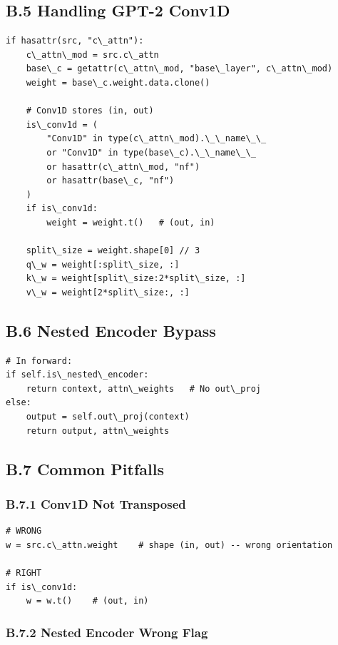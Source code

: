 \subsection{B.5 Handling GPT-2 Conv1D}

\begin{lstlisting}
if hasattr(src, "c\_attn"):
    c\_attn\_mod = src.c\_attn
    base\_c = getattr(c\_attn\_mod, "base\_layer", c\_attn\_mod)
    weight = base\_c.weight.data.clone()
    
    # Conv1D stores (in, out)
    is\_conv1d = (
        "Conv1D" in type(c\_attn\_mod).\_\_name\_\_
        or "Conv1D" in type(base\_c).\_\_name\_\_
        or hasattr(c\_attn\_mod, "nf")
        or hasattr(base\_c, "nf")
    )
    if is\_conv1d:
        weight = weight.t()   # (out, in)
    
    split\_size = weight.shape[0] // 3
    q\_w = weight[:split\_size, :]
    k\_w = weight[split\_size:2*split\_size, :]
    v\_w = weight[2*split\_size:, :]
\end{lstlisting}

\subsection{B.6 Nested Encoder Bypass}

\begin{lstlisting}
# In forward:
if self.is\_nested\_encoder:
    return context, attn\_weights   # No out\_proj
else:
    output = self.out\_proj(context)
    return output, attn\_weights
\end{lstlisting}

\subsection{B.7 Common Pitfalls}

\subsubsection{B.7.1 Conv1D Not Transposed}

\begin{lstlisting}
# WRONG
w = src.c\_attn.weight    # shape (in, out) -- wrong orientation

# RIGHT
if is\_conv1d:
    w = w.t()    # (out, in)
\end{lstlisting}

\subsubsection{B.7.2 Nested Encoder Wrong Flag}

